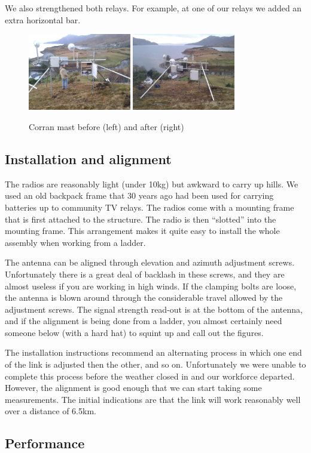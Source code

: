 We also strengthened both relays. For example, at one of our relays we
added an extra horizontal bar.

\begin{figure}[h]
\includegraphics[width=0.4\textwidth]{corran-before-from-behind}
\includegraphics[width=0.4\textwidth]{corran-after-from-behind}
\caption{Corran mast before (left) and after (right)}
\end{figure}

\subsection{Installation and alignment}
\label{january-2014.-installation-and-alignment}

The radios are reasonably light (under 10kg) but awkward to carry up
hills. We used an old backpack frame that 30 years ago had been used
for carrying batteries up to community TV relays. The radios come with
a mounting frame that is first attached to the structure. The radio is
then ``slotted'' into the mounting frame. This arrangement makes it
quite easy to install the whole assembly when working from a ladder.

The antenna can be aligned through elevation and azimuth
adjustment screws. Unfortunately there is a great deal of backlash in
these screws, and they are almost useless if you are working in high
winds. If the clamping bolts are loose, the antenna is blown around
through the considerable travel allowed by the adjustment screws. The
signal strength read-out is at the bottom of the antenna, and if
the alignment is being done from a ladder, you almost certainly
need someone below (with a hard hat) to squint up and call out
the figures.

The installation instructions recommend an alternating process in which
one end of the link is adjusted then the other, and so
on. Unfortunately we were unable to complete this process before
the weather closed in and our workforce departed. However, the
alignment is good enough that we can start taking some measurements.
The initial indications are that the link will work reasonably well
over a distance of 6.5km.

\subsection{Performance}\label{performance}
